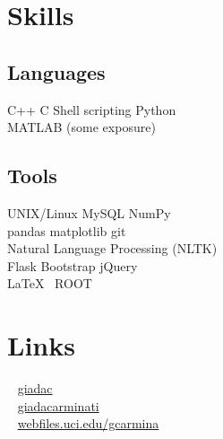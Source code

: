 \documentclass[letterpaper]{deedy-resume} %
\begin{document}
\begin{minipage}[t]{0.29\textwidth} %


\section{Skills}

\subsection{Languages}
C++ \textbullet{} C \textbullet{} Shell scripting \textbullet{} Python \\ 
 MATLAB (some exposure) \\ 

\subsection{Tools}
UNIX/Linux \textbullet{} MySQL \textbullet{} NumPy \\
pandas \textbullet{} matplotlib \textbullet{} git \\
Natural Language Processing (NLTK) \\
Flask \textbullet{} Bootstrap \textbullet{} jQuery \\
\LaTeX\ \textbullet{} ROOT \\

\sectionspace %



\section{Links} 

\faGithub ~ \href{https://github.com/giadac}{giadac} \\
\faLinkedinSign ~ \href{https://www.linkedin.com/in/giadacarminati}{giadacarminati} \\
\faHome ~ \href{https://webfiles.uci.edu/gcarmina}{webfiles.uci.edu/gcarmina} \\ 


\end{minipage}
\end{document}
